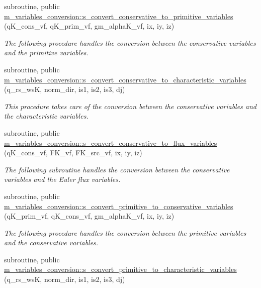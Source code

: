 \begin{DoxyCompactItemize}
subroutine, public \hyperlink{namespacem__variables__conversion_a4b22f555477e0d617f5cf53fd4e2fa38}{m\+\_\+variables\+\_\+conversion\+::s\+\_\+convert\+\_\+conservative\+\_\+to\+\_\+primitive\+\_\+variables} (q\+K\+\_\+cons\+\_\+vf, q\+K\+\_\+prim\+\_\+vf, gm\+\_\+alpha\+K\+\_\+vf, ix, iy, iz)
\begin{DoxyCompactList}\small\item\em The following procedure handles the conversion between the conservative variables and the primitive variables. \end{DoxyCompactList}\item 
subroutine, public \hyperlink{namespacem__variables__conversion_af05a8e081300b76aa2a685d598cb5b92}{m\+\_\+variables\+\_\+conversion\+::s\+\_\+convert\+\_\+conservative\+\_\+to\+\_\+characteristic\+\_\+variables} (q\+\_\+rs\+\_\+wsK, norm\+\_\+dir, is1, is2, is3, dj)
\begin{DoxyCompactList}\small\item\em This procedure takes care of the conversion between the conservative variables and the characteristic variables. \end{DoxyCompactList}\item 
subroutine, public \hyperlink{namespacem__variables__conversion_abede800c9696158470575d8758460360}{m\+\_\+variables\+\_\+conversion\+::s\+\_\+convert\+\_\+conservative\+\_\+to\+\_\+flux\+\_\+variables} (q\+K\+\_\+cons\+\_\+vf, F\+K\+\_\+vf, F\+K\+\_\+src\+\_\+vf, ix, iy, iz)
\begin{DoxyCompactList}\small\item\em The following subroutine handles the conversion between the conservative variables and the Euler flux variables. \end{DoxyCompactList}\item 
subroutine, public \hyperlink{namespacem__variables__conversion_a1dbfde20c4af4e0ad0989f4629889809}{m\+\_\+variables\+\_\+conversion\+::s\+\_\+convert\+\_\+primitive\+\_\+to\+\_\+conservative\+\_\+variables} (q\+K\+\_\+prim\+\_\+vf, q\+K\+\_\+cons\+\_\+vf, gm\+\_\+alpha\+K\+\_\+vf, ix, iy, iz)
\begin{DoxyCompactList}\small\item\em The following procedure handles the conversion between the primitive variables and the conservative variables. \end{DoxyCompactList}\item 
subroutine, public \hyperlink{namespacem__variables__conversion_a7f62727a697f6be7f205bbc65156d508}{m\+\_\+variables\+\_\+conversion\+::s\+\_\+convert\+\_\+primitive\+\_\+to\+\_\+characteristic\+\_\+variables} (q\+\_\+rs\+\_\+wsK, norm\+\_\+dir, is1, is2, is3, dj)

\end{DoxyCompactItemize}
